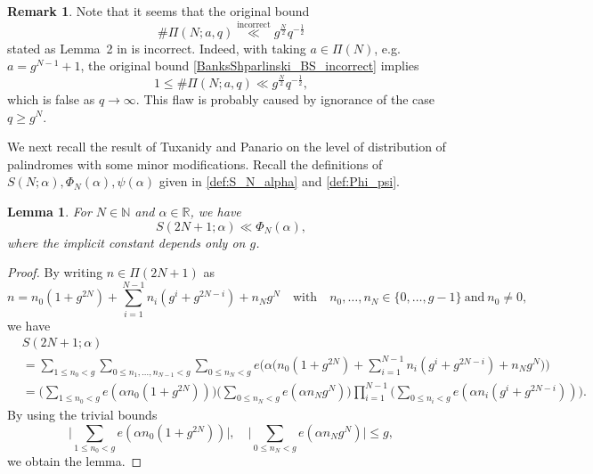 \documentclass{amsart}
\theoremstyle{plain}
\newtheorem{lemma}[theorem]{Lemma}
\theoremstyle{definition}
\newtheorem{remark}[theorem]{Remark}
\begin{document}
\begin{remark}
\label{rem:BanksShparlinski_BS}
Note that it seems that the original bound
\begin{equation}
\label{BanksShparlinski_BS_incorrect}
\#\Pi(N;a,q)
\overset{\text{incorrect}}{\ll}
g^{\frac{N}{2}}q^{-\frac{1}{2}}
\end{equation}
stated as Lemma~2 in \cite[p.~96]{BanksShparlinski:PalindromePhi} is incorrect.
Indeed, with taking $a\in\Pi(N)$, e.g.\ $a=g^{N-1}+1$,
the original bound \cref{BanksShparlinski_BS_incorrect} implies
\[
1
\le
\#\Pi(N;a,q)
\ll
g^{\frac{N}{2}}q^{-\frac{1}{2}},
\]
which is false as $q\to\infty$.
This flaw is probably caused by ignorance of the case $q\ge g^{N}$.
\end{remark}

We next recall the result of Tuxanidy and Panario
on the level of distribution of palindromes
with some minor modifications.
Recall the definitions of $S(N;\alpha),\Phi_{N}(\alpha),\psi(\alpha)$
given in \cref{def:S_N_alpha} and \cref{def:Phi_psi}.
\begin{lemma}
\label{lem:S_to_Phi}
For $N\in\mathbb{N}$ and $\alpha\in\mathbb{R}$, we have
\[
S(2N+1;\alpha)
\ll
\Phi_{N}(\alpha),
\]
where the implicit constant depends only on $g$.
\end{lemma}
\begin{proof}
By writing $n\in\Pi(2N+1)$ as
\[
n
=
n_{0}(1+g^{2N})
+\sum_{i=1}^{N-1}n_{i}(g^{i}+g^{2N-i})
+n_{N}g^{N}
\quad\text{with}\quad
n_{0},\ldots,n_{N}\in\{0,\ldots,g-1\}
\ \text{and}\ 
n_{0}\neq0,
\]
we have
\begin{align}
&S(2N+1;\alpha)\\
&=
\sum_{1\le n_{0}<g}
\sum_{0\le n_{1},\ldots,n_{N-1}<g}
\sum_{0\le n_{N}<g}
e\biggl(
\alpha\biggl(
n_{0}(1+g^{2N})
+\sum_{i=1}^{N-1}n_{i}(g^{i}+g^{2N-i})
+n_{N}g^{N}
\biggr)\biggr)\\
&=
\biggl(\sum_{1\le n_{0}<g}e(\alpha n_{0}(1+g^{2N}))\biggr)
\biggl(\sum_{0\le n_{N}<g}e(\alpha n_{N}g^{N})\biggr)
\prod_{i=1}^{N-1}
\biggl(\sum_{0\le n_{i}<g}e(\alpha n_{i}(g^{i}+g^{2N-i}))\biggr).
\end{align}
By using the trivial bounds
\[
\biggl|\sum_{1\le n_{0}<g}e(\alpha n_{0}(1+g^{2N}))\biggr|,\quad
\biggl|\sum_{0\le n_{N}<g}e(\alpha n_{N}g^{N})\biggr|
\le
g,
\]
we obtain the lemma.
\end{proof}
\end{document}
